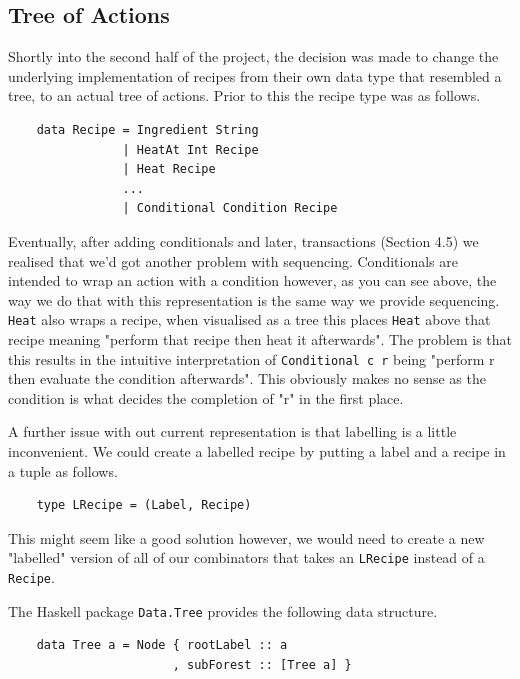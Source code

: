 \documentclass[11pt]{article}
\begin{document}
\subsection{Tree of Actions}

Shortly into the second half of the project, the decision was made to change the underlying
implementation of recipes from their own data type that resembled a tree, to an actual tree
of actions. Prior to this the recipe type was as follows.

\begin{lstlisting}
    data Recipe = Ingredient String
                | HeatAt Int Recipe
                | Heat Recipe
                ...
                | Conditional Condition Recipe
\end{lstlisting}

Eventually, after adding conditionals and later, transactions (Section 4.5) we realised that
we'd got another problem with sequencing. Conditionals are intended to wrap an action with
a condition however, as you can see above, the way we do that with this representation is the
same way we provide sequencing. \texttt{Heat} also wraps a recipe, when visualised as a tree
this places \texttt{Heat} above that recipe meaning "perform that recipe then heat it afterwards".
The problem is that this results in the intuitive interpretation of \texttt{Conditional c r}
being "perform r then evaluate the condition afterwards". This obviously makes no sense as the
condition is what decides the completion of "r" in the first place.

\medbreak

A further issue with out current representation is that labelling is a little inconvenient.
We could create a labelled recipe by putting a label and a recipe in a tuple as follows.

\begin{lstlisting}
    type LRecipe = (Label, Recipe)
\end{lstlisting}

This might seem like a good solution however, we would need to create a new "labelled"
version of all of our combinators that takes an \texttt{LRecipe} instead of a \texttt{Recipe}.

\medbreak

The Haskell package \texttt{Data.Tree} provides the following data structure.

\begin{lstlisting}
    data Tree a = Node { rootLabel :: a
                       , subForest :: [Tree a] }
\end{lstlisting}
\end{document}
